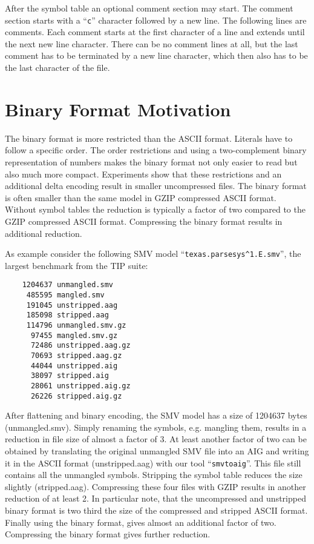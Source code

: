 \documentclass[10pt]{llncs}
\begin{document}
  After the symbol table an optional comment section may start.  The comment
  section starts with a ``\texttt{c}'' character followed by a new line.  The following
  lines are comments.  Each comment starts at the first character of a line
  and extends until the next new line character.  There can be no comment
  lines at all, but the last comment has to be terminated by a new line
  character, which then also has to be the last character of the file.

\section{Binary Format Motivation}

  The binary format is more restricted than the ASCII format.  Literals have
  to follow a specific order.  The order restrictions and using a
  two-complement binary representation of numbers makes the binary format
  not only easier to read but also much more compact.  Experiments show that
  these restrictions and an additional delta encoding result in smaller
  uncompressed files.  The binary format is often smaller than the same
  model in GZIP compressed ASCII format.  Without symbol tables the
  reduction is typically a factor of two compared to the GZIP compressed
  ASCII format.  Compressing the binary format results in additional
  reduction.  
  
  As example consider the following SMV model ``\texttt{texas.parsesys\^\relax 1.E.smv}'', the
  largest benchmark from the TIP suite:  
\begin{verbatim}
    1204637 unmangled.smv
     485595 mangled.smv
     191045 unstripped.aag
     185098 stripped.aag
     114796 unmangled.smv.gz
      97455 mangled.smv.gz
      72486 unstripped.aag.gz
      70693 stripped.aag.gz
      44044 unstripped.aig
      38097 stripped.aig
      28061 unstripped.aig.gz
      26226 stripped.aig.gz
\end{verbatim}
  After flattening and binary encoding, the SMV model has a size of 1204637
  bytes (unmangled.smv).  Simply renaming the symbols, e.g. mangling them,
  results in a reduction in file size of almost a factor of 3.  At least
  another factor of two can be obtained by translating the original
  unmangled SMV file into an AIG and writing it in the ASCII format
  (unstripped.aag) with our tool ``\texttt{smvtoaig}''.  This file still contains all
  the unmangled symbols.  Stripping the symbol table reduces the size
  slightly (stripped.aag).  Compressing these four files with GZIP results
  in another reduction of at least 2.  In particular note, that the
  uncompressed and unstripped binary format is two third the size of the
  compressed and stripped ASCII format.  Finally using the binary format,
  gives almost an additional factor of two.  Compressing the binary format
  gives further reduction.
\end{document}
